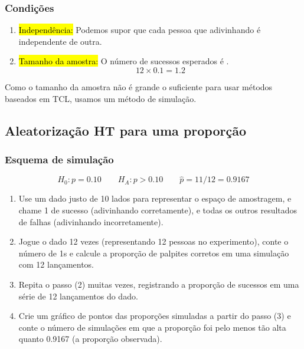 \begin{frame}
\frametitle{Condições}

\begin{enumerate}
\justifying
\item \hl{Independência:} Podemos supor que cada pessoa que adivinhando é independente de outra.
\justifying
\item \hl{Tamanho da amostra:} O número de sucessos esperados é .
\[ 12 \times 0.1 = 1.2 \]

\end{enumerate}
\justifying
{}
\justifying
Como o tamanho da amostra não é grande o suficiente para usar métodos baseados em TCL, usamos um método de simulação.

\end{frame}


\subsection{Aleatorização HT para uma proporção}


\begin{frame}
\frametitle{Esquema de simulação}
\justifying
{}
\vspace{-0.5cm}
\[ H_0: p = 0.10 \qquad H_A: p > 0.10 \qquad \hat{p} = 11 / 12 = 0.9167 \]

\begin{enumerate}
\justifying
\item Use um dado justo de 10 lados para representar o espaço de amostragem, e chame 1 de sucesso (adivinhando corretamente), e todas os outros resultados de falhas (adivinhando incorretamente).

\justifying
\item Jogue o dado 12 vezes (representando 12 pessoas no experimento), conte o número de 1s e calcule a proporção de palpites corretos em uma simulação com 12 lançamentos.
\justifying
\item Repita o passo (2) muitas vezes, registrando a proporção de sucessos em uma série de 12 lançamentos do dado.
\justifying
\item Crie um gráfico de pontos das proporções simuladas a partir do passo (3) e conte o número de simulações em que a proporção foi pelo menos tão alta quanto 0.9167 (a proporção observada).

\end{enumerate}

\end{frame}

